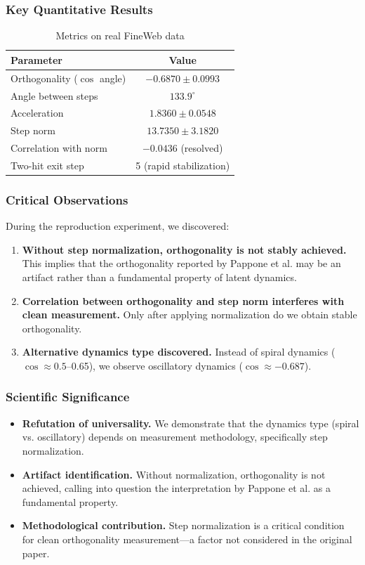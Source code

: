 \subsubsection{Key Quantitative Results}

\begin{table}[h]
\centering
\caption{Metrics on real FineWeb data}
\begin{tabular}{lc}
\toprule
Parameter & Value \\
\midrule
Orthogonality ($\cos$ angle) & $-0.6870 \pm 0.0993$ \\
Angle between steps & $133.9^\circ$ \\
Acceleration & $1.8360 \pm 0.0548$ \\
Step norm & $13.7350 \pm 3.1820$ \\
Correlation with norm & $-0.0436$ (resolved) \\
Two-hit exit step & 5 (rapid stabilization) \\
\bottomrule
\end{tabular}
\end{table}

\subsubsection{Critical Observations}

During the reproduction experiment, we discovered:

\begin{enumerate}
    \item \textbf{Without step normalization, orthogonality is not stably achieved.} This implies that the orthogonality reported by Pappone et al. may be an artifact rather than a fundamental property of latent dynamics.
    \item \textbf{Correlation between orthogonality and step norm interferes with clean measurement.} Only after applying normalization do we obtain stable orthogonality.
    \item \textbf{Alternative dynamics type discovered.} Instead of spiral dynamics ($\cos \approx 0.5$--0.65), we observe oscillatory dynamics ($\cos \approx -0.687$).
\end{enumerate}

\subsubsection{Scientific Significance}

\begin{itemize}
    \item \textbf{Refutation of universality.} We demonstrate that the dynamics type (spiral vs. oscillatory) depends on measurement methodology, specifically step normalization.
    \item \textbf{Artifact identification.} Without normalization, orthogonality is not achieved, calling into question the interpretation by Pappone et al. as a fundamental property.
    \item \textbf{Methodological contribution.} Step normalization is a critical condition for clean orthogonality measurement—a factor not considered in the original paper.
\end{itemize}

